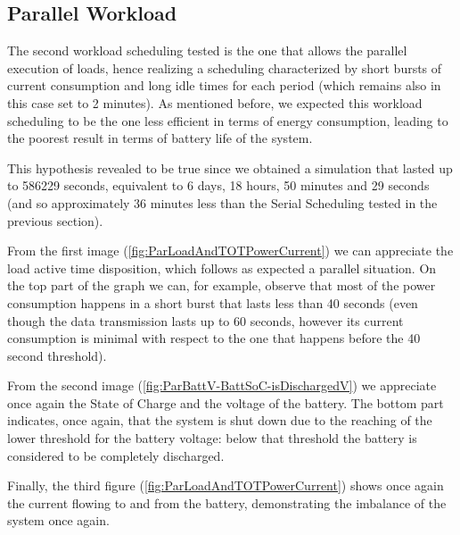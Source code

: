 \documentclass[a4paper]{article}
\begin{document}
    \subsection{Parallel Workload}
        The second workload scheduling tested is the one that allows the parallel execution of loads, hence realizing a scheduling characterized by short bursts of current consumption and long idle times for each period (which remains also in this case set to 2 minutes). As mentioned before, we expected this workload scheduling to be the one less efficient in terms of energy consumption, leading to the poorest result in terms of battery life of the system.

        This hypothesis revealed to be true since we obtained a simulation that lasted up to 586229 seconds, equivalent to 6 days, 18 hours, 50 minutes and 29 seconds (and so approximately 36 minutes less than the Serial Scheduling tested in the previous section).

        From the first image (\ref{fig:ParLoadAndTOTPowerCurrent}) we can appreciate the load active time disposition, which follows as expected a parallel situation. On the top part of the graph we can, for example, observe that most of the power consumption happens in a short burst that lasts less than 40 seconds (even though the data transmission lasts up to 60 seconds, however its current consumption is minimal with respect to the one that happens before the 40 second threshold).

        From the second image (\ref{fig:ParBattV-BattSoC-isDischargedV}) we appreciate once again the State of Charge and the voltage of the battery. The bottom part indicates, once again, that the system is shut down due to the reaching of the lower threshold for the battery voltage: below that threshold the battery is considered to be completely discharged.

        Finally, the third figure (\ref{fig:ParLoadAndTOTPowerCurrent}) shows once again the current flowing to and from the battery, demonstrating the imbalance of the system once again.
\end{document}

